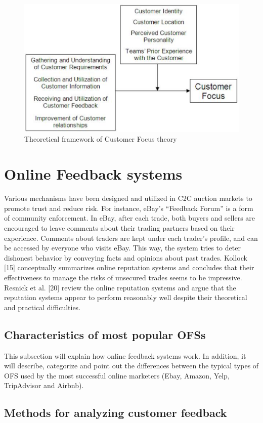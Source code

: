 \label{sec:OFS}
\begin{figure}[h!]
	\centering
	\includegraphics[height=0.3\textheight]{fig01/CustomerFocus}
	\caption{Theoretical framework of Customer Focus theory}
	\label{fig:CustomerFocus}
\end{figure}

\section{Online Feedback systems}

Various mechanisms have been designed and utilized
in C2C auction markets to promote trust and reduce risk.
For instance,
eBay's “Feedback Forum” is a form of community enforcement.
In eBay, after each trade, both buyers and
sellers are encouraged to leave comments about their
trading partners based on their experience. Comments
about traders are kept under each trader's profile, and can be accessed by everyone who visits eBay. This way, the
system tries to deter dishonest behavior by conveying
facts and opinions about past trades. Kollock [15]
conceptually summarizes online reputation systems and
concludes that their effectiveness to manage the risks of
unsecured trades seems to be impressive. Resnick et al.
[20] review the online reputation systems and argue that
the reputation systems appear to perform reasonably well
despite their theoretical and practical difficulties. \cite{yang2007effects}


\subsection{Characteristics of most popular OFSs}
\label{subsec:popularOFS}

This subsection will explain how online feedback systems work. In addition, it will describe, categorize and point out the differences between the typical types of OFS used by the most successful online marketers (Ebay, Amazon, Yelp, TripAdvisor and Airbnb). 

\subsection{Methods for analyzing customer feedback}
\label{subsec:feedbackmethods}